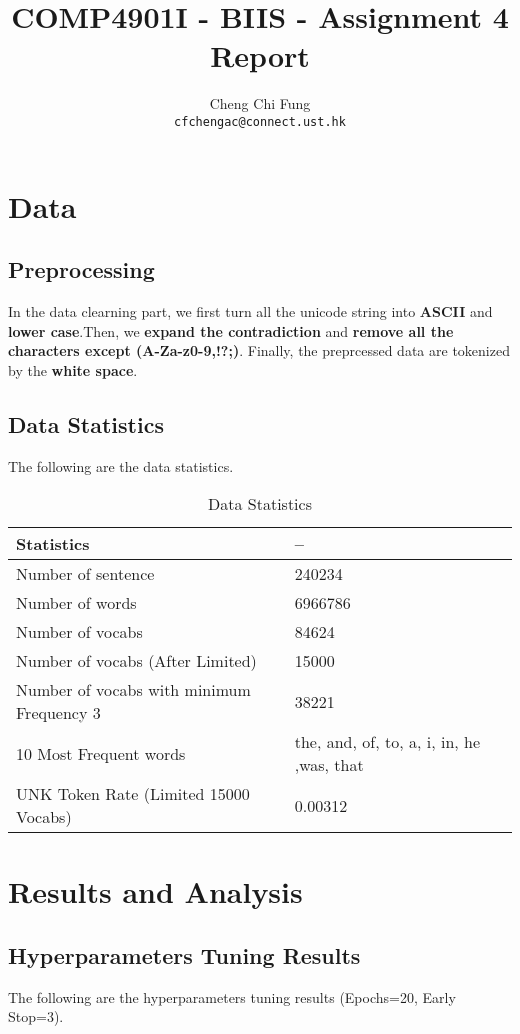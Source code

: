\documentclass{article}
\title{COMP4901I - BIIS - Assignment 4 Report}
\author{%
	Cheng Chi Fung \\
	\texttt{cfchengac@connect.ust.hk} \\
}
\begin{document}
\maketitle

\section{Data}

\subsection{Preprocessing}

In the data clearning part, we first turn all the unicode string into \textbf{ASCII} and \textbf{lower case}.Then, we \textbf{expand the contradiction} and \textbf{remove all the characters except (A-Za-z0-9,!?;)}. Finally, the preprcessed data are tokenized by the \textbf{white space}. 

\subsection{Data Statistics}
The following are the data statistics.

\begin{table}[htb]
	\caption{Data Statistics}
	\label{sample-table}
	\centering
	\begin{tabular}{ll}
		\toprule
		\cmidrule{1-2}
		Statistics & --  \\
		\midrule
		Number of sentence & 240234 \\
		Number of words & 6966786  \\
		Number of vocabs & 84624 \\
		Number of vocabs (After Limited) & 15000 \\
		Number of vocabs with minimum Frequency 3 & 38221 \\
		10 Most Frequent words & the, and, of, to, a, i, in, he ,was, that \\
		UNK Token Rate (Limited 15000 Vocabs) & 0.00312 \\
		\bottomrule
	\end{tabular}
\end{table}

\section{Results and Analysis}

\subsection{Hyperparameters Tuning Results}
The following are the hyperparameters tuning results (Epochs=20, Early Stop=3).
\end{document}
